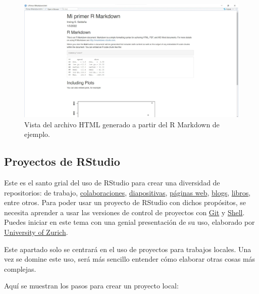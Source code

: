 \documentclass[
]{article}
\theoremstyle{definition}
\theoremstyle{definition}
\theoremstyle{definition}
\theoremstyle{definition}
\theoremstyle{remark}
\begin{document}
\begin{figure}

{\centering \includegraphics[width=1\linewidth]{figs/screenshots/abrir R Markdown 7} 

}

\caption{Vista del archivo HTML generado a partir del R Markdown de ejemplo.}\label{fig:figura29}
\end{figure}

\hypertarget{proyectos-de-rstudio}{%
\subsection{Proyectos de RStudio}\label{proyectos-de-rstudio}}

Este es el santo grial del uso de RStudio para crear una diversidad de repositorios: de trabajo, \href{https://medium.com/@jonathanmines/the-ultimate-github-collaboration-guide-df816e98fb67}{colaboraciones}, \href{https://bookdown.org/yihui/rmarkdown/xaringan.html}{diapositivas}, \href{https://rmarkdown.rstudio.com/lesson-13.html}{páginas web}, \href{https://bookdown.org/yihui/blogdown/}{blogs}, \href{https://bookdown.org/}{libros}, entre otros. Para poder usar un proyecto de RStudio con dichos propósitos, se necesita aprender a usar las versiones de control de proyectos con \href{https://happygitwithr.com/install-git.html}{Git} y \href{https://cfss.uchicago.edu/setup/shell/}{Shell}. Puedes iniciar en este tema con una genial presentación de su uso, elaborado por \href{https://www.geo.uzh.ch/microsite/reproducible_research/post/rr-rstudio-git/}{University of Zurich}.

Este apartado solo se centrará en el uso de proyectos para trabajos locales. Una vez se domine este uso, será más sencillo entender cómo elaborar otras cosas más complejas.

Aquí se muestran los pasos para crear un proyecto local:
\end{document}
